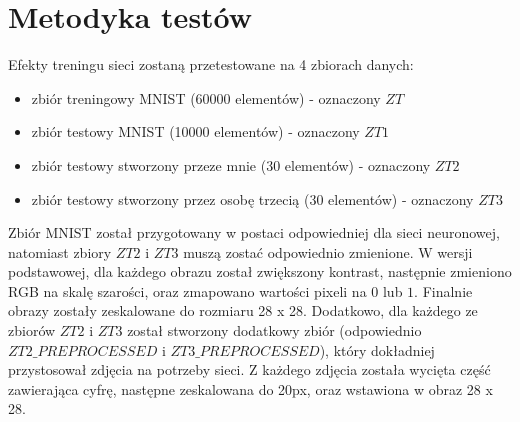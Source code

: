 \section*{Metodyka testów}
Efekty treningu sieci zostaną przetestowane na 4 zbiorach danych:
\begin{itemize}
    \setlength\itemsep{-1.5em}
    \item zbiór treningowy MNIST (60000 elementów) - oznaczony $ZT$
    \item zbiór testowy MNIST (10000 elementów) - oznaczony $ZT1$
    \item zbiór testowy stworzony przeze mnie (30 elementów) - oznaczony $ZT2$
    \item zbiór testowy stworzony przez osobę trzecią (30 elementów) - oznaczony $ZT3$
\end{itemize}
Zbiór MNIST został przygotowany w postaci odpowiedniej dla sieci neuronowej, natomiast zbiory $ZT2$ i $ZT3$ muszą zostać odpowiednio zmienione. W wersji podstawowej, dla każdego obrazu został zwiększony kontrast, następnie zmieniono RGB na skalę szarości, oraz zmapowano wartości pixeli na $0$ lub $1$. Finalnie obrazy zostały zeskalowane do rozmiaru 28 x 28. Dodatkowo, dla każdego ze zbiorów $ZT2$ i $ZT3$ został stworzony dodatkowy zbiór (odpowiednio $ZT2\_PREPROCESSED$ i $ZT3\_PREPROCESSED$), który dokładniej przystosował zdjęcia na potrzeby sieci. Z każdego zdjęcia została wycięta część zawierająca cyfrę, następne zeskalowana do 20px, oraz wstawiona w obraz 28 x 28.

